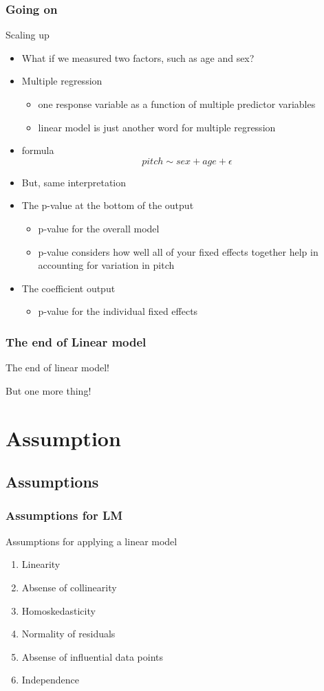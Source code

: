 \documentclass{beamer}\usepackage[]{graphicx}\usepackage[]{color}
\begin{document}
\begin{frame}
\frametitle{Going on}
Scaling up
\begin{itemize}
\item What if we measured two factors, such as age and sex?
\item Multiple regression
	\begin{itemize}
	\item one response variable as a function of multiple predictor variables
	\item linear model is just another word for multiple regression
	\end{itemize}
\item formula
\begin{displaymath}
pitch \sim sex + age + \epsilon
\end{displaymath}
\item But, same interpretation
\item The p-value at the bottom of the output
	\begin{itemize}
	\item p-value for the \alert{overall model}
	\item p-value considers how well all of your fixed effects together help in accounting for variation in pitch
	\end{itemize}
\item The coefficient output
	\begin{itemize}
	\item p-value for the individual fixed effects
	\end{itemize}
\end{itemize}
\end{frame}

\begin{frame}
\frametitle{The end of Linear model}
\centering
\Huge
The end of linear model!

But one more thing!
\end{frame}

\section{Assumption}
\subsection{Assumptions}
\begin{frame}
\frametitle{Assumptions for LM}
Assumptions for applying a linear model
\begin{enumerate}
\item Linearity
\item Absense of collinearity
\item Homoskedasticity
\item Normality of residuals
\item Absense of influential data points
\item Independence
\end{enumerate}
\end{frame}
\end{document}
